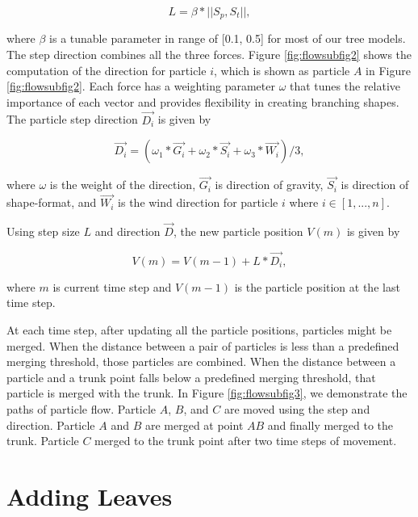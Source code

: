 \begin{equation}
\label{eqn:model1}
			L = \beta * ||S_p, S_t||,
\end{equation}

where $\beta$ is a tunable parameter in range of [0.1, 0.5] for most of our tree models. The step direction combines all the three forces. Figure \ref{fig:flowsubfig2} shows the computation of the direction for particle $i$, which is shown as particle $A$ in Figure \ref{fig:flowsubfig2}. Each force has a weighting parameter $\omega$ that tunes the relative importance of each vector and provides flexibility in creating branching shapes. The particle step direction $\vec{D_i}$ is given by

\begin{equation}
\label{eqn:model2}
	\vec{D_i} = (\omega_1*\vec{G_i} + \omega_2*\vec{S_i} + \omega_3*\vec{W_i} )/3,
\end{equation}

where $\omega$ is the weight of the direction, $\vec{G_i}$ is direction of gravity, $\vec{S_i}$ is direction of shape-format, and $\vec{W_i}$ is the wind direction for particle $i$ where $i\in[1,...,n]$.

Using step size $L$ and direction $\vec{D}$, the new particle position $V(m)$ is given by

\begin{equation}
\label{eqn:model3}
 V(m) = V(m-1) + L*\vec{D_i},
\end{equation}

where $m$ is current time step and $V(m-1)$ is the particle position at the last time step.

At each time step, after updating all the particle positions, particles might be merged. When the distance between a pair of particles is less than a predefined merging threshold, those particles are combined. When the distance between a particle and a trunk point falls below a predefined merging threshold, that particle is merged with the trunk. In Figure \ref{fig:flowsubfig3}, we demonstrate the paths of particle flow. Particle $A$, $B$, and $C$ are moved using the step and direction. Particle $A$ and $B$ are merged at point $AB$ and finally merged to the trunk. Particle $C$ merged to the trunk point after two time steps of movement.

\section{Adding Leaves}

